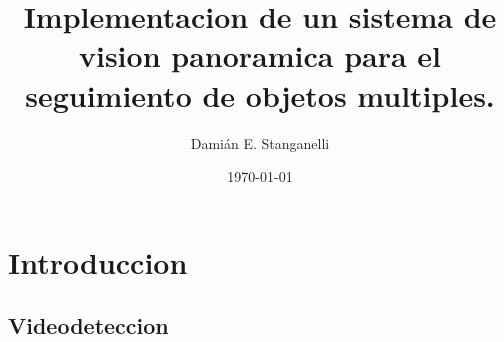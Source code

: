 \documentclass[12pt,a4paper]{article}
\begin{document}
\title{Implementacion de un sistema de vision panoramica para el seguimiento de objetos multiples.}
\author{Damián E. Stanganelli}
\date{\today}
\maketitle

\pagebreak

\tableofcontents

\pagebreak










\section{Introduccion}
\subsection{Videodeteccion}
\end{document}
